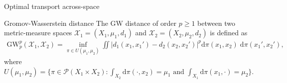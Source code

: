 \documentclass{beamer}
\newcommand{\gw}{\text{GW}}
\newcommand{\cX}{\mathcal X}
\newcommand{\rmd}{\mathrm{d}}
\begin{document}

\begin{frame}{Optimal transport across-space}
  \vspace{-0cm}
  \scriptsize
  \begin{block}{Gromov-Wasserstein distance \parencite{Memoli07,Memoli11}}
  The GW distance of order $p \geq 1$ between two metric-measure spaces
  $\cX_1 = (X_1, \mu_1, d_1)$ and $\cX_2 = (X_2, \mu_2, d_2)$ is defined as
  \begin{align*}
    \gw_p^p(\cX_1, \cX_2) = \inf_{\pi \in U(\mu_1, \mu_2)}
    \iint \left| d_1(x_1, x_1') - d_2(x_2, x_2') \right|^p
    \rmd\pi(x_1, x_2) \; \rmd\pi(x_1', x_2'),
  \end{align*}
  where $U(\mu_1, \mu_2) = \{ \pi \in \mathcal P(X_1 \times X_2): \int_{X_2} \rmd\pi(\cdot, x_2) = \mu_1 \text{ and } \int_{X_1} \rmd\pi(x_1, \cdot) = \mu_2 \}$.
\end{block}



\end{frame}
\end{document}
